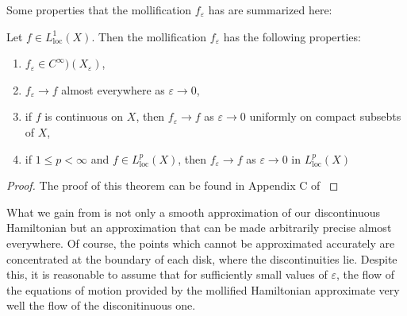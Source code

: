 Some properties that the mollification $f_\varepsilon$ has are summarized here:
\begin{theorem}\label{thm:mollification}
Let $f\in L_{\text{loc}}^1(X)$. Then the mollification $f_\varepsilon$ has the following properties:
\begin{enumerate}
\item $f_\varepsilon\in C^\infty)(X_\varepsilon)$,
\item $f_\varepsilon\to f$ almost everywhere as $\varepsilon\to0$,
\item if $f$ is continuous on $X$, then $f_\varepsilon\to f$ as $\varepsilon\to0$ uniformly on compact subsebts of $X$,
\item if $1\le p <\infty$ and $f\in L_{\text{loc}}^p(X)$, then $f_\varepsilon\to f$ as $\varepsilon\to 0$ in $L_{\text{loc}}^p(X)$
\end{enumerate}
\end{theorem}
\begin{proof}
The proof of this theorem can be found in Appendix C of \cite{Evans_1998}
\end{proof}

What we gain from  is not only a smooth approximation of our discontinuous Hamiltonian but an approximation that can be made arbitrarily precise almost everywhere. Of course, the points which cannot be approximated accurately are concentrated at the boundary of each disk, where the discontinuities lie. Despite this, it is reasonable to assume that for sufficiently small values of $\varepsilon$, the flow of the equations of motion provided by the mollified Hamiltonian approximate very well the flow of the disconitinuous one.